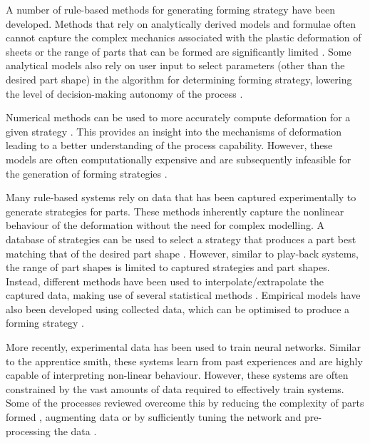 A number of rule-based methods for generating forming strategy have been developed. Methods that rely on analytically derived models and formulae often cannot capture the complex mechanics associated with the plastic deformation of sheets \citep{Yang2011GeometricalProcess,Yang2009AutomatisierungProgramming,Vazquez2017RoboticWheeling,Polyblank2015TheSpinning} or the range of parts that can be formed are significantly limited \citep{Nzahumunyurwa2001OptimizationProcess}. Some analytical models also rely on user input to select parameters (other than the desired part shape) in the algorithm for determining forming strategy, lowering the level of decision-making autonomy of the process \citep{Tanaka2012DevelopmentSystem,Asakawa2010DevelopmentProcess}.

Numerical methods can be used to more accurately compute deformation for a given strategy \citep{Bowen2021NumericalProcess,Hoffmann2005StudiesMetal}. This provides an insight into the mechanisms of deformation leading to a better understanding of the process capability. However, these models are often computationally expensive and are subsequently infeasible for the generation of forming strategies \citep{Scherer2013MethodenBlechumformung,Polyblank2015TheSpinning}. 

Many rule-based systems rely on data that has been captured experimentally to generate strategies for parts. These methods inherently capture the nonlinear behaviour of the deformation without the need for complex modelling. A database of strategies can be used to select a strategy that produces a part best matching that of the desired part shape \citep{Mori1998IncrementalDatabase}. However, similar to play-back systems, the range of part shapes is limited to captured strategies and part shapes. Instead, different methods have been used to interpolate/extrapolate the captured data, making use of several statistical methods \citep{Opritescu2012AutomatedStrategy,Opritescu2016VariationVariance,Hartmann2019Knowledge-basedPartitioning,Henkenjohann2005AnProcess}. Empirical models have also been developed using collected data, which can be optimised to produce a forming strategy \citep{Mori1996DeterminationAlgorithm,Auer2004ComparisonSpinning}.

More recently, experimental data has been used to train neural networks. Similar to the apprentice smith, these systems learn from past experiences and are highly capable of interpreting non-linear behaviour. However, these systems are often constrained by the vast amounts of data required to effectively train systems. Some of the processes reviewed overcome this by reducing the complexity of parts formed \citep{Opritescu2015AutomatedApproach}, augmenting data \citep{Rossi2018ModellingWheel,Rossi2018ReLearningSurfaces} or by sufficiently tuning the network and pre-processing the data \citep{Hartmann2019AnFree-forming}.

